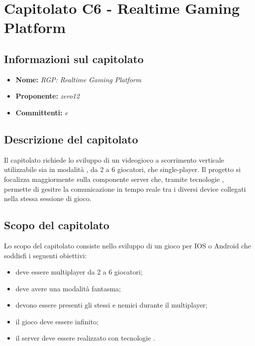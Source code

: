 \section{Capitolato C6 - Realtime Gaming Platform}
\subsection{Informazioni sul capitolato}
\begin{itemize}
	\item \textbf{Nome:} \textit{RGP: Realtime Gaming Platform}
	\item \textbf{Proponente:} \textit{zero12}
	\item \textbf{Committenti:} \textit{\VT{} e \CR{}}
\end{itemize}

\subsection{Descrizione del capitolato}
Il capitolato richiede lo sviluppo di un videogioco a scorrimento verticale utilizzabile sia in modalità , da 2 a 6 giocatori, che single-player. Il progetto si focalizza maggiormente sulla componente server che, tramite tecnologie , permette di gesitre la comunicazione in tempo reale tra i diversi device collegati nella stessa sessione di gioco.

\subsection{Scopo del capitolato}
Lo scopo del capitolato consiste nello sviluppo di un gioco per IOS o Android che soddisfi i seguenti obiettivi:
\begin{itemize}
	\item deve essere multiplayer da 2 a 6 giocatori;
	\item deve avere una modalità fantasma;
	\item devono essere presenti gli stessi  e nemici durante il multiplayer;
	\item il gioco deve essere infinito;
	\item il server deve essere realizzato con tecnologie .
\end{itemize}

